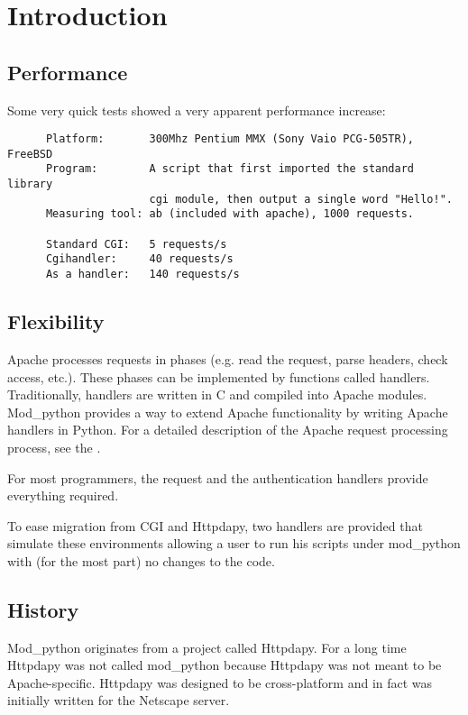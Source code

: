 \chapter{Introduction\label{introduction}}

\section{Performance\label{intr-performance}}

Some very quick tests showed a very apparent performance increase: 

\begin{verbatim}
      Platform:       300Mhz Pentium MMX (Sony Vaio PCG-505TR), FreeBSD
      Program:        A script that first imported the standard library 
                      cgi module, then output a single word "Hello!".
      Measuring tool: ab (included with apache), 1000 requests.

      Standard CGI:   5 requests/s
      Cgihandler:     40 requests/s
      As a handler:   140 requests/s
\end{verbatim}         

\section{Flexibility\label{intr-flexibility}}

Apache processes requests in phases (e.g. read the request, parse
headers, check access, etc.). These phases can be implemented by
functions called handlers. Traditionally, handlers are written in C
and compiled into Apache modules. Mod_python provides a way to extend
Apache functionality by writing Apache handlers in Python. For a
detailed description of the Apache request processing process, see the
.

For most programmers, the request and the authentication handlers
provide everything required.

To ease migration from CGI and Httpdapy, two handlers are provided
that simulate these environments allowing a user to run his scripts
under mod_python with (for the most part) no changes to the code.
 
\section{History\label{intr-history}}

Mod_python originates from a project called Httpdapy. For a long time
Httpdapy was not called mod_python because Httpdapy was not meant to
be Apache-specific. Httpdapy was designed to be cross-platform and in
fact was initially written for the Netscape server.

